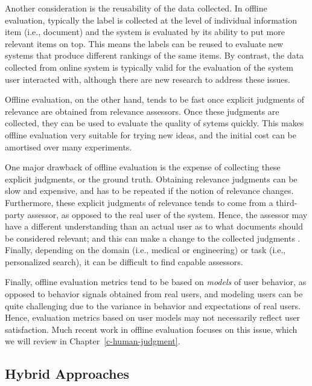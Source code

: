 Another consideration is the reusability of the data collected. In offline evaluation, typically the label is collected at the level of individual information item (i.e., document) and the system is evaluated by its ability to put more relevant items on top. This means the labels can be reused to evaluate new systems that produce different rankings of the same items. By contrast, the data collected from online system is typically valid for the evaluation of the system user interacted with, although there are new research to address these issues.

Offline evaluation, on the other hand, tends to be fast once explicit judgments of relevance are obtained from relevance assessors. Once these judgments are collected, they can be used to evaluate the quality of sytems quickly. This makes offline evaluation very suitable for trying new ideas, and the initial cost can be amortised over many experiments. %

One major drawback of offline evaluation is the expense of collecting these explicit judgments, or the ground truth. Obtaining relevance judgments can be slow and expensive, and has to be repeated if the notion of relevance changes. Furthermore, these explicit judgments of relevance tends to come from a third-party assessor, as opposed to the real user of the system. Hence, the assessor may have a different understanding than an actual user as to what documents should be considered relevant; and this can make a change to the collected judgments \citep{Bailey:2008}. Finally, depending on the domain (i.e., medical or engineering) or task (i.e., personalized search), it can be difficult to find capable assessors. 

Finally, offline evaluation metrics tend to be based on \emph{models} of user behavior, as opposed to behavior signals obtained from real users, and modeling users can be quite challenging due to the variance in behavior and expectations of real users. Hence, evaluation metrics based on user models may not necessarily reflect user satisfaction. Much recent work in offline evaluation focuses on this issue, which we will review in Chapter~\ref{c-human-judgment}.

\subsection{Hybrid Approaches}

